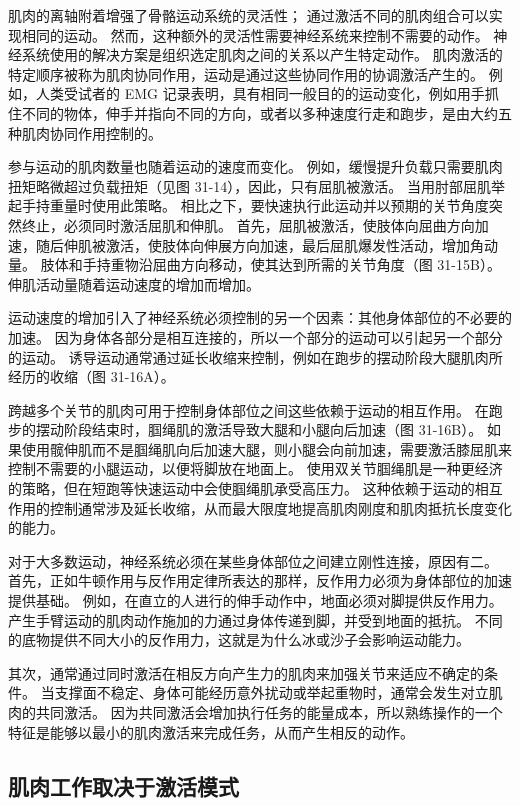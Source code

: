 肌肉的离轴附着增强了骨骼运动系统的灵活性； 通过激活不同的肌肉组合可以实现相同的运动。 然而，这种额外的灵活性需要神经系统来控制不需要的动作。 神经系统使用的解决方案是组织选定肌肉之间的关系以产生特定动作。 肌肉激活的特定顺序被称为肌肉协同作用，运动是通过这些协同作用的协调激活产生的。 例如，人类受试者的 EMG 记录表明，具有相同一般目的的运动变化，例如用手抓住不同的物体，伸手并指向不同的方向，或者以多种速度行走和跑步，是由大约五种肌肉协同作用控制的。

参与运动的肌肉数量也随着运动的速度而变化。 例如，缓慢提升负载只需要肌肉扭矩略微超过负载扭矩（见图 31-14），因此，只有屈肌被激活。 当用肘部屈肌举起手持重量时使用此策略。 相比之下，要快速执行此运动并以预期的关节角度突然终止，必须同时激活屈肌和伸肌。 首先，屈肌被激活，使肢体向屈曲方向加速，随后伸肌被激活，使肢体向伸展方向加速，最后屈肌爆发性活动，增加角动量。 肢体和手持重物沿屈曲方向移动，使其达到所需的关节角度（图 31-15B）。 伸肌活动量随着运动速度的增加而增加。

运动速度的增加引入了神经系统必须控制的另一个因素：其他身体部位的不必要的加速。 因为身体各部分是相互连接的，所以一个部分的运动可以引起另一个部分的运动。 诱导运动通常通过延长收缩来控制，例如在跑步的摆动阶段大腿肌肉所经历的收缩（图 31-16A）。

跨越多个关节的肌肉可用于控制身体部位之间这些依赖于运动的相互作用。 在跑步的摆动阶段结束时，腘绳肌的激活导致大腿和小腿向后加速（图 31-16B）。 如果使用髋伸肌而不是腘绳肌向后加速大腿，则小腿会向前加速，需要激活膝屈肌来控制不需要的小腿运动，以便将脚放在地面上。 使用双关节腘绳肌是一种更经济的策略，但在短跑等快速运动中会使腘绳肌承受高压力。 这种依赖于运动的相互作用的控制通常涉及延长收缩，从而最大限度地提高肌肉刚度和肌肉抵抗长度变化的能力。

对于大多数运动，神经系统必须在某些身体部位之间建立刚性连接，原因有二。 首先，正如牛顿作用与反作用定律所表达的那样，反作用力必须为身体部位的加速提供基础。 例如，在直立的人进行的伸手动作中，地面必须对脚提供反作用力。 产生手臂运动的肌肉动作施加的力通过身体传递到脚，并受到地面的抵抗。 不同的底物提供不同大小的反作用力，这就是为什么冰或沙子会影响运动能力。

其次，通常通过同时激活在相反方向产生力的肌肉来加强关节来适应不确定的条件。 当支撑面不稳定、身体可能经历意外扰动或举起重物时，通常会发生对立肌肉的共同激活。 因为共同激活会增加执行任务的能量成本，所以熟练操作的一个特征是能够以最小的肌肉激活来完成任务，从而产生相反的动作。

\subsection{肌肉工作取决于激活模式}

